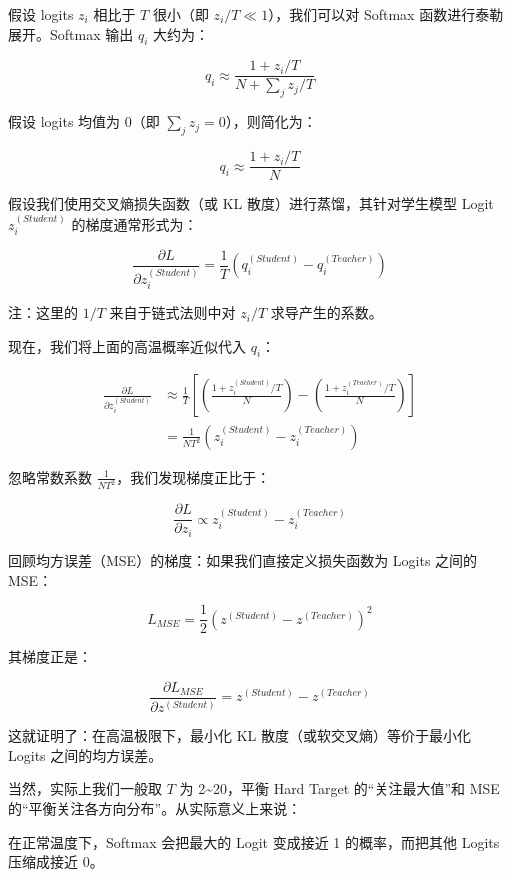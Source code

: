 假设 logits \(z_i\) 相比于 \(T\) 很小（即 \(z_i / T \ll 1\)），我们可以对 Softmax 函数进行泰勒展开。Softmax 输出 \(q_i\) 大约为：

\[
q_i \approx \frac{1 + z_i / T}{N + \sum_j z_j / T}
\]

假设 logits 均值为 0（即 \(\sum_j z_j = 0\)），则简化为：

\[
q_i \approx \frac{1 + z_i / T}{N}
\]

假设我们使用交叉熵损失函数（或 KL 散度）进行蒸馏，其针对学生模型 Logit \(z_i^{(Student)}\) 的梯度通常形式为：

\[
\frac{\partial L}{\partial z_i^{(Student)}} = \frac{1}{T}\left(q_i^{(Student)} - q_i^{(Teacher)}\right)
\]

注：这里的 \(1/T\) 来自于链式法则中对 \(z_i / T\) 求导产生的系数。

现在，我们将上面的高温概率近似代入 \(q_i\)：

\[
\begin{aligned}
\frac{\partial L}{\partial z_i^{(Student)}} &\approx \frac{1}{T}\left[\left(\frac{1 + z_i^{(Student)} / T}{N}\right) - \left(\frac{1 + z_i^{(Teacher)} / T}{N}\right)\right] \\
&= \frac{1}{NT^2}\left(z_i^{(Student)} - z_i^{(Teacher)}\right)
\end{aligned}
\]

忽略常数系数 \(\frac{1}{NT^2}\)，我们发现梯度正比于：

\[
\frac{\partial L}{\partial z_i} \propto z_i^{(Student)} - z_i^{(Teacher)}
\]

回顾均方误差（MSE）的梯度：如果我们直接定义损失函数为 Logits 之间的 MSE：

\[
L_{MSE} = \frac{1}{2}\left(z^{(Student)} - z^{(Teacher)}\right)^2
\]

其梯度正是：

\[
\frac{\partial L_{MSE}}{\partial z^{(Student)}} = z^{(Student)} - z^{(Teacher)}
\]

这就证明了：在高温极限下，最小化 KL 散度（或软交叉熵）等价于最小化 Logits 之间的均方误差。

当然，实际上我们一般取 \(T\) 为 2\textasciitilde20，平衡 Hard Target 的``关注最大值''和 MSE 的``平衡关注各方向分布''。从实际意义上来说：

在正常温度下，Softmax 会把最大的 Logit 变成接近 1 的概率，而把其他 Logits 压缩成接近 0。

